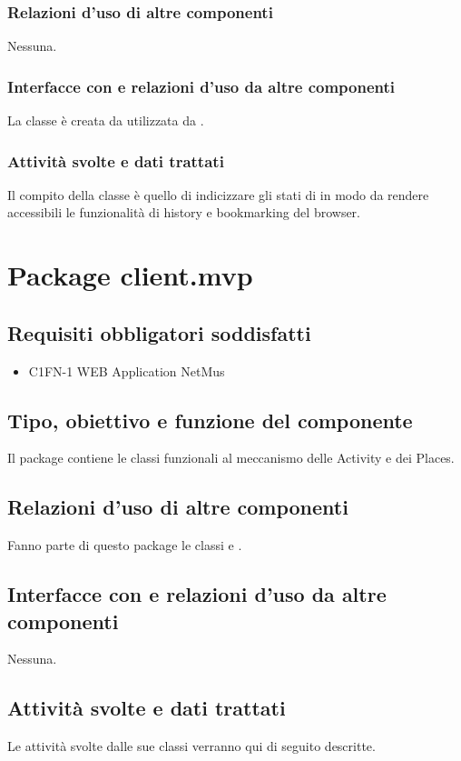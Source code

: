 \subsubsection*{Relazioni d'uso di altre componenti}
Nessuna.
\subsubsection*{Interfacce con e relazioni d'uso da altre componenti}
La classe \`e creata da  utilizzata da .
\subsubsection*{Attivit\`a svolte e dati trattati}
Il compito della classe \`e quello di indicizzare gli stati di
 in modo da rendere accessibili le funzionalit\`a di
history e bookmarking del browser.

\newpage
\section{Package client.mvp} %
\subsection*{Requisiti obbligatori soddisfatti}
\begin{itemize}
	\item C1FN-1 WEB Application NetMus
\end{itemize}
\subsection*{Tipo, obiettivo e funzione del componente}
Il package contiene le classi funzionali al meccanismo delle Activity e dei
Places.
\subsection*{Relazioni d'uso di altre componenti}
Fanno parte di questo package le classi  e
.
\subsection*{Interfacce con e relazioni d'uso da altre componenti}
Nessuna.
\subsection*{Attivit\`a svolte e dati trattati}
Le attivit\`a svolte dalle sue classi verranno qui di seguito descritte.

